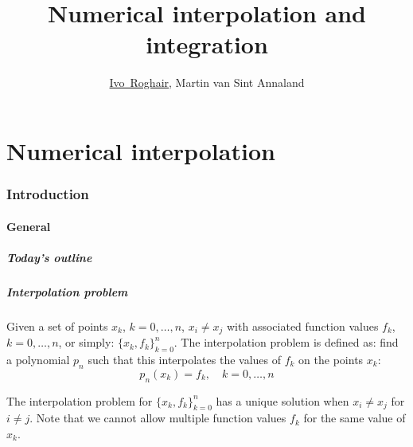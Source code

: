 \documentclass[11pt,table,final,fleqn,xcolor={usenames,dvipsnames,table},handout]{beamer}
\title{Numerical interpolation and integration}
\author[I.~Roghair]{\underline{Ivo~Roghair}, Martin van Sint Annaland}
\institute[SPI]{{Chemical Process Intensification,\\
  Eindhoven University of Technology}}
\date
\begin{document}


\frame[plain]{
  \titlepage
}
\part{Numerical interpolation}
\frame{\partpage}
\section{Introduction}
\subsection*{General}
\begin{frame}[label=contents]
  \frametitle{Today's outline}
\end{frame}

\begin{frame}
  \frametitle{Interpolation problem}
  \begin{definition}
  Given a set of points $x_k$, $k=0,\ldots,n$, $x_i \neq x_j$ with associated function values $f_k$, $k=0,\ldots,n$, or simply: $\{x_k,f_k\}_{k=0}^n$. The interpolation problem is defined as: find a polynomial $p_n$ such that this interpolates the values of $f_k$ on the points $x_k$:
  \[
    p_n(x_k)=f_k, \quad k=0,\ldots,n
  \]
  \end{definition}
  \pause
  \begin{theorem}
    The interpolation problem for $\{x_k,f_k\}_{k=0}^n$ has a unique solution when $x_i \neq x_j$ for $i \neq j$. Note that we cannot allow multiple function values $f_k$ for the same value of $x_k$.
  \end{theorem}
\end{frame}
\end{document}

